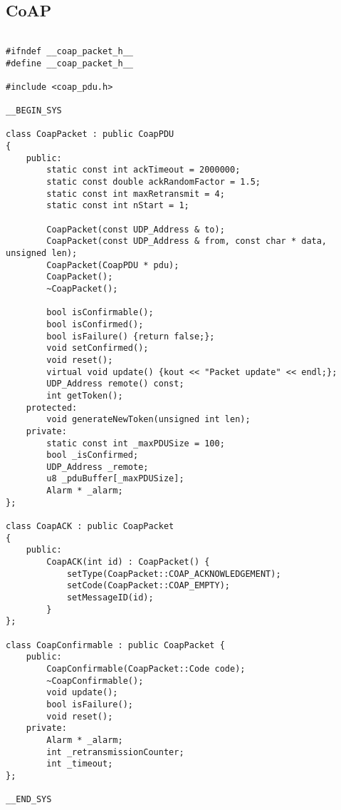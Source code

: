 
\subsection{CoAP}

\begin{lstlisting}

#ifndef __coap_packet_h__
#define __coap_packet_h__

#include <coap_pdu.h>

__BEGIN_SYS

class CoapPacket : public CoapPDU
{
    public:
        static const int ackTimeout = 2000000;
        static const double ackRandomFactor = 1.5;
        static const int maxRetransmit = 4;
        static const int nStart = 1;

        CoapPacket(const UDP_Address & to);
        CoapPacket(const UDP_Address & from, const char * data, unsigned len);
        CoapPacket(CoapPDU * pdu);
        CoapPacket();
        ~CoapPacket();

        bool isConfirmable();
        bool isConfirmed();
        bool isFailure() {return false;};
        void setConfirmed();
        void reset();
        virtual void update() {kout << "Packet update" << endl;};
        UDP_Address remote() const;
        int getToken();
    protected:
        void generateNewToken(unsigned int len);
    private:
        static const int _maxPDUSize = 100;
        bool _isConfirmed;
        UDP_Address _remote;
        u8 _pduBuffer[_maxPDUSize];
        Alarm * _alarm;
};

class CoapACK : public CoapPacket
{
    public:
        CoapACK(int id) : CoapPacket() {
            setType(CoapPacket::COAP_ACKNOWLEDGEMENT);
            setCode(CoapPacket::COAP_EMPTY);
            setMessageID(id);
        }
};

class CoapConfirmable : public CoapPacket {
    public:
        CoapConfirmable(CoapPacket::Code code);
        ~CoapConfirmable();
        void update();
        bool isFailure();
        void reset();
    private:
        Alarm * _alarm;
        int _retransmissionCounter;
        int _timeout;
};

__END_SYS


\end{lstlisting}
